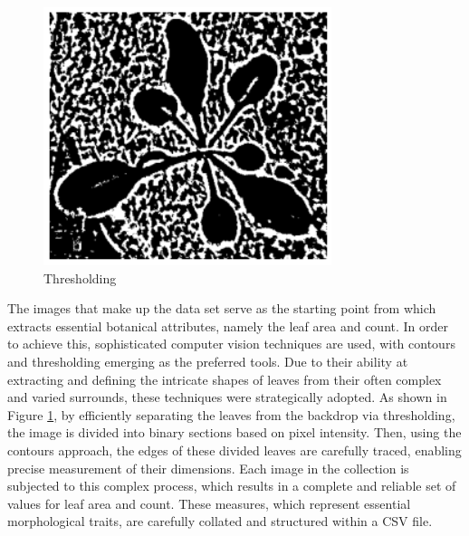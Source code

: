 \documentclass[a4paper,12pt]{report}%
\renewcommand{\\}{\vspace*{0.5\baselineskip} \newline}
\begin{document}
\begin{figure}[h]
\centering
	\includegraphics[scale=1.5]{images/Thresholding.png}\\
	\begin{footnotesize}
		\caption{Thresholding}
		\label{Thresholding}
	\end{footnotesize}
\end{figure}




\noindent The images that make up the data set serve as the starting point from which extracts essential botanical attributes, namely the leaf area and count. In order to achieve this, sophisticated computer vision techniques are used, with contours and thresholding emerging as the preferred tools. Due to their ability at extracting and defining the intricate shapes of leaves from their often complex and varied surrounds, these techniques were strategically adopted. As shown in Figure \ref{Thresholding}, by efficiently separating the leaves from the backdrop via thresholding, the image is divided into binary sections based on pixel intensity. Then, using the contours approach, the edges of these divided leaves are carefully traced, enabling precise measurement of their dimensions.
Each image in the collection is subjected to this complex process, which results in a complete and reliable set of values for leaf area and count. These measures, which represent essential morphological traits, are carefully collated and structured within a CSV file.
\end{document}
